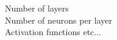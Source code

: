 \documentclass[preview]{standalone}
\begin{document}
Number of layers\\Number of neurons per layer\\Activation functions etc...\\
\end{document}

